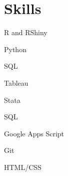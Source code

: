 \documentclass[letterpaper,11pt]{article}
\begin{document}

\section{Skills}
\vspace{-12pt}
\begin{itemize}
\small
\begin{minipage}{0.3\linewidth}
    \item R and RShiny
    \item Python
    \item SQL
\end{minipage}
\begin{minipage}{0.025\linewidth}
	\item[\hspace{\fill}]
	\item[\hspace{\fill}]
	\item[\hspace{\fill}]
\end{minipage}
\begin{minipage}{0.3\linewidth}
    \item Tableau
    \item Stata
    \item SQL
\end{minipage}
\begin{minipage}{0.025\linewidth}
	\item[\hspace{\fill}]
	\item[\hspace{\fill}]
	\item[\hspace{\fill}]
\end{minipage}
\begin{minipage}{0.3\linewidth}
	\item Google Apps Script
    \item Git
    \item HTML/CSS
\end{minipage}
\end{itemize}
\end{document}
